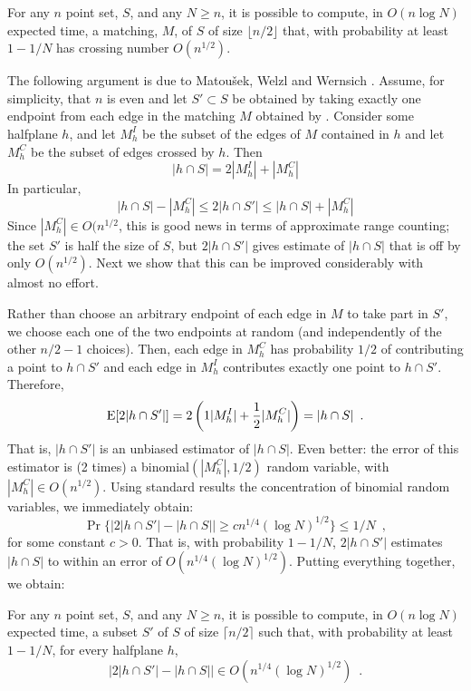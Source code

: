 \documentclass{cccg12}
\begin{document}
\begin{cor}
  For any $n$ point set, $S$, and any $N\ge n$, it is possible to
  compute, in $O(n\log N)$ expected time, a matching, $M$, of $S$ of
  size $\lfloor n/2\rfloor$ that, with probability at least $1-1/N$
  has crossing number $O(n^{1/2})$.
\end{cor}

The following argument is due to Matou\v{s}ek, Welzl and Wernsich
\cite[Lemma~2.5]{mww93}.  Assume, for simplicity, that $n$ is even and let
$S'\subset S$ be obtained by taking exactly one endpoint from each edge in
the matching $M$ obtained by .  Consider some halfplane
$h$,  and let $M^{I}_h$ be the subset of the edges of $M$ contained in
$h$ and let $M^{C}_h$ be the subset of edges crossed by $h$. Then
\[
     |h\cap S| = 2|M^{I}_h| + |M^{C}_h|
\] 
In particular,
\[
     |h\cap S| - |M^{C}_h| \le 2|h\cap S'| \le |h\cap S| + |M^{C}_h| 
\]
Since $|M^C_h|\in O(n^{1/2}$, this is good news in terms of approximate
range counting;  the set $S'$ is half the size of $S$, but $2|h\cap
S'|$ gives estimate of $|h\cap S|$ that is off by only $O(n^{1/2})$.
Next we show that this can be improved considerably with almost no effort.

Rather than choose an arbitrary endpoint of each edge in $M$ to
take part in $S'$, we choose each one of the two endpoints at random
(and independently of the other $n/2-1$ choices).  Then, each edge in
$M^{C}_h$ has probability $1/2$ of contributing a point to $h\cap S'$
and each edge in $M^{I}_h$ contributes exactly one point to $h\cap S'$.
Therefore,
\[
    \mathrm{E}[2|h\cap S'|]
      = 2\left(1|M^{I}_h| + \frac{1}{2}|M^{C}_h|\right) = |h\cap S| \enspace .
\]
That is, $|h\cap S'|$ is an unbiased estimator of $|h\cap
S|$.  Even better: the error of this estimator is (2 times) a
binomial$(|M^{C}_h|,1/2)$ random variable, with $|M^{C}_h|\in
O(n^{1/2})$.  Using standard results the concentration of binomial random
variables, we immediately obtain:
\[
   \Pr\{\left|2|h \cap S'| - |h\cap S|\right| \ge c n^{1/4}(\log N)^{1/2}\} 
       \le 1/N \enspace ,
\]
for some constant $c>0$.  That is, with probability $1-1/N$, $2|h\cap S'|$
estimates $|h\cap S|$ to within an error of $O(n^{1/4}(\log N)^{1/2})$.
Putting everything together, we obtain:

\begin{lem}
  For any $n$ point set, $S$, and any $N\ge n$, it is possible to
  compute, in $O(n\log N)$ expected time, a subset $S'$ of $S$ of 
  size $\lceil n/2\rceil$ such that, 
  with probability at least $1-1/N$, for every halfplane $h$,
  \[
     \left|2|h\cap S'| - |h\cap S|\right| \in O(n^{1/4}(\log N)^{1/2}) \enspace .
  \]
\end{lem}
\end{document}

